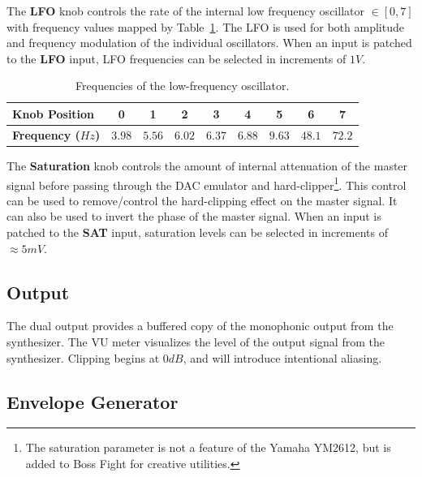 \documentclass[12pt,letter]{article}
\begin{document}
The \textbf{LFO} knob controls the rate of the internal low frequency oscillator $\in [0, 7]$ with frequency values mapped by Table~\ref{tab:lfo-frequencies}. The LFO is used for both amplitude and frequency modulation of the individual oscillators. When an input is patched to the \textbf{LFO} input, LFO frequencies can be selected in increments of $1V$.

\begin{table}[!htp]
\centering
\caption{Frequencies of the low-frequency oscillator.}
\label{tab:lfo-frequencies}
\begin{tabular}{|l|c|c|c|c|c|c|c|c|}
\hline
\bfseries Knob Position    & 0      & 1      & 2      & 3      & 4      & 5      & 6      & 7      \\
\hline
\bfseries Frequency ($Hz$) & $3.98$ & $5.56$ & $6.02$ & $6.37$ & $6.88$ & $9.63$ & $48.1$ & $72.2$ \\
\hline
\end{tabular}
\end{table}

The \textbf{Saturation} knob controls the amount of internal attenuation of the master signal before passing through the DAC emulator and hard-clipper\footnote{The saturation parameter is not a feature of the Yamaha YM2612, but is added to Boss Fight for creative utilities.}. This control can be used to remove/control the hard-clipping effect on the master signal. It can also be used to invert the phase of the master signal. When an input is patched to the \textbf{SAT} input, saturation levels can be selected in increments of $\approx5mV$.

\subsection{Output}

The dual output provides a buffered copy of the monophonic output from the synthesizer. The VU meter visualizes the level of the output signal from the synthesizer. Clipping begins at $0dB$, and will introduce intentional aliasing.

\subsection{Envelope Generator}
\end{document}
